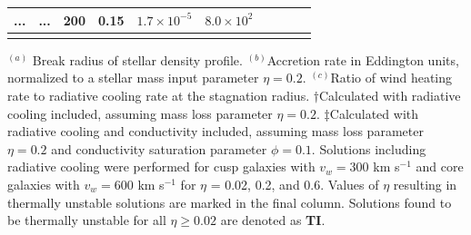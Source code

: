 \documentclass[usenatbib,fleqn]{mn2e}
\newcommand{\Mbh}[1][]{M_{\bullet#1}}
\begin{document}
\begin{table}
\begin{threeparttable}
\begin{minipage}{18cm}
\begin{tabular}{lccccccccc}
... & ... & 200 & 0.15 & $ 1.7 \times 10^{ -5 }$ & $ 8.0 \times 10^{ 2 }$ \\
\hline
\label{table:models}  
\end{tabular}
\begin{tablenotes}
\item $^{(a)}$ Break radius of stellar density profile.  $^{(b)}$Accretion
  rate in Eddington units, normalized to a stellar mass input
  parameter $\eta = 0.2$.  $^{(c)}$Ratio of wind heating rate to
  radiative cooling rate at the stagnation radius. $\dagger$Calculated with
  radiative cooling included, assuming mass loss parameter $\eta =
  0.2$.  $\ddagger$Calculated with radiative cooling and conductivity
  included, assuming mass loss parameter $\eta = 0.2$ and conductivity
  saturation parameter $\phi = 0.1$.  Solutions including radiative cooling were performed for cusp galaxies with $v_w=300 $ km s$^{-1}$ and core galaxies with $v_w=600 $ km s$^{-1}$ for $\eta$ = 0.02, 0.2, and 0.6.  Values of $\eta$ resulting in thermally unstable solutions are marked in the final column.  Solutions found to be thermally unstable for all $\eta
  \geq 0.02$ are denoted as {\bf TI}.
\end{tablenotes}
\end{minipage}
\end{threeparttable}

\end{table}




\end{document}
